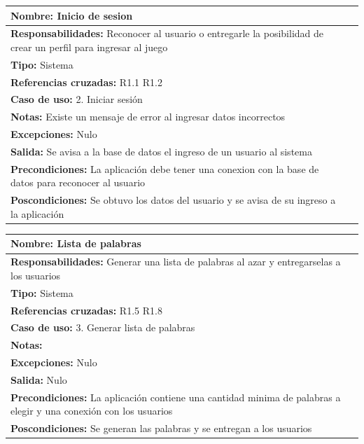 \begin{table}[H]
    \begin{center}
        \begin{tabular}{| l | m{12cm} |}         
        	\hline 
        	\textbf{Nombre:} Inicio de sesion \\
        	\hline
        	\textbf{Responsabilidades:} Reconocer al usuario o entregarle la posibilidad de crear un perfil para ingresar al juego\\
        	\hline
        	\textbf{Tipo:} Sistema \\
        	\hline
        	\textbf{Referencias cruzadas:} R1.1 R1.2\\
        	\hline
        	\textbf{Caso de uso:} 2. Iniciar sesión\\
        	\hline
        	\textbf{Notas:} Existe un mensaje de error al ingresar datos incorrectos\\
        	\hline
        	\textbf{Excepciones:} Nulo\\
        	\hline
        	\textbf{Salida:} Se avisa a la base de datos el ingreso de un usuario al sistema\\
        	\hline
        	\textbf{Precondiciones:} La aplicación debe tener una conexion con la base de datos para reconocer al usuario \\
        	\hline
        	\textbf{Poscondiciones:} Se obtuvo los datos del usuario y se avisa de su ingreso a la aplicación\\
        	\hline
        \end{tabular}
    \end{center}
\end{table}

\begin{table}[H]
    \begin{center}
        \begin{tabular}{| l | m{12cm} |}            
        	\hline 
        	\textbf{Nombre:} Lista de palabras \\
        	\hline
        	\textbf{Responsabilidades:} Generar una lista de palabras al azar y entregarselas a los usuarios\\
        	\hline
        	\textbf{Tipo:} Sistema\\
        	\hline
        	\textbf{Referencias cruzadas:} R1.5 R1.8\\
        	\hline
        	\textbf{Caso de uso:} 3. Generar lista de palabras\\
        	\hline
        	\textbf{Notas:} \\
        	\hline
        	\textbf{Excepciones:} Nulo \\
        	\hline
        	\textbf{Salida:} Nulo\\
        	\hline
        	\textbf{Precondiciones:} La aplicación contiene una cantidad minima de palabras a elegir y una conexión con los usuarios\\
        	\hline
        	\textbf{Poscondiciones:} Se generan las palabras y se entregan a los usuarios\\
        	\hline
        \end{tabular}
    \end{center}
\end{table}

